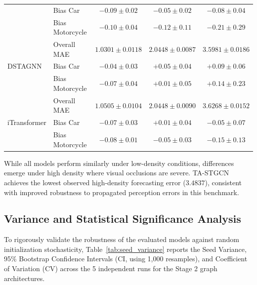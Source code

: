 \documentclass[preprint,12pt]{elsarticle}
\begin{document}
\begin{table}[htbp]
{\begin{tabular}{llccc}
 & Bias Car & $-0.09 \pm 0.02$ & $-0.05 \pm 0.02$ & $-0.08 \pm 0.04$ \\
 & Bias Motorcycle & $-0.10 \pm 0.04$ & $-0.12 \pm 0.11$ & $-0.21 \pm 0.29$ \\
\midrule
\multirow{3}{*}{DSTAGNN} & Overall MAE & $1.0301 \pm 0.0118$ & $2.0448 \pm 0.0087$ & $3.5981 \pm 0.0186$ \\
 & Bias Car & $-0.04 \pm 0.03$ & $+0.05 \pm 0.04$ & $+0.09 \pm 0.06$ \\
 & Bias Motorcycle & $-0.07 \pm 0.04$ & $+0.01 \pm 0.05$ & $+0.14 \pm 0.23$ \\
\midrule
\multirow{3}{*}{iTransformer} & Overall MAE & $1.0505 \pm 0.0104$ & $2.0448 \pm 0.0090$ & $3.6268 \pm 0.0152$ \\
 & Bias Car & $-0.07 \pm 0.03$ & $+0.01 \pm 0.04$ & $-0.05 \pm 0.07$ \\
 & Bias Motorcycle & $-0.08 \pm 0.01$ & $-0.05 \pm 0.03$ & $-0.15 \pm 0.13$ \\
\bottomrule
\end{tabular}%
}
\end{table}

While all models perform similarly under low-density conditions, differences emerge under high density where visual occlusions are severe. TA-STGCN achieves the lowest observed high-density forecasting error ($3.4837$), consistent with improved robustness to propagated perception errors in this benchmark.

\subsection{Variance and Statistical Significance Analysis}
\label{sec:variance_analysis}

To rigorously validate the robustness of the evaluated models against random initialization stochasticity, Table~\ref{tab:seed_variance} reports the Seed Variance, 95\% Bootstrap Confidence Intervals (CI, using 1,000 resamples), and Coefficient of Variation (CV) across the 5 independent runs for the Stage 2 graph architectures.
\end{document}
